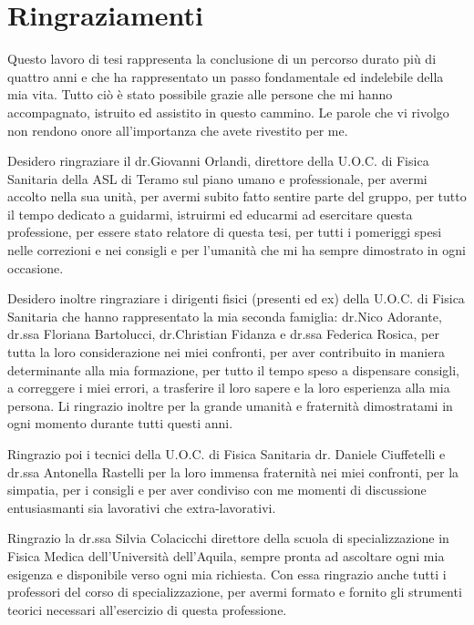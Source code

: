 
\chapter*{Ringraziamenti}
Questo lavoro di tesi rappresenta la conclusione di un percorso durato più di quattro anni e che ha rappresentato un passo fondamentale ed indelebile della mia vita. Tutto ciò è stato possibile grazie alle persone che mi hanno accompagnato, istruito ed assistito in questo cammino. Le parole che vi rivolgo non rendono onore all'importanza che avete rivestito per me.

\vspace*{2ex}

Desidero ringraziare il dr.Giovanni Orlandi, direttore della U.O.C. di Fisica Sanitaria della ASL di Teramo sul piano umano e professionale, per avermi accolto nella sua unità, per avermi subito fatto sentire parte del gruppo, per tutto il tempo dedicato a guidarmi, istruirmi ed educarmi ad esercitare questa professione, per essere stato relatore di questa tesi, per tutti i pomeriggi spesi nelle correzioni e nei consigli e per l'umanità che mi ha sempre dimostrato in ogni occasione.

\vspace*{2ex}

Desidero inoltre ringraziare i dirigenti fisici (presenti ed ex) della U.O.C. di Fisica Sanitaria che hanno rappresentato la mia seconda famiglia: dr.Nico Adorante, dr.ssa Floriana Bartolucci, dr.Christian Fidanza e dr.ssa Federica Rosica, per tutta la loro considerazione nei miei confronti, per aver contribuito in maniera determinante alla mia formazione, per tutto il tempo speso a dispensare consigli, a correggere i miei errori, a trasferire il loro sapere e la loro esperienza alla mia persona. Li ringrazio inoltre per la grande umanità e fraternità dimostratami in ogni momento durante tutti questi anni.

\vspace*{2ex}

Ringrazio poi i tecnici della U.O.C. di Fisica Sanitaria dr. Daniele Ciuffetelli e dr.ssa Antonella Rastelli per la loro immensa fraternità nei miei confronti, per la simpatia, per i consigli e per aver condiviso con me momenti di discussione entusiasmanti sia lavorativi che extra-lavorativi.

\vspace*{2ex}

Ringrazio la dr.ssa Silvia Colacicchi direttore della scuola di specializzazione in Fisica Medica dell'Università dell'Aquila, sempre pronta ad ascoltare ogni mia esigenza e disponibile verso ogni mia richiesta. Con essa ringrazio anche tutti i professori del corso di specializzazione, per avermi formato e fornito gli strumenti teorici necessari all'esercizio di questa professione.

